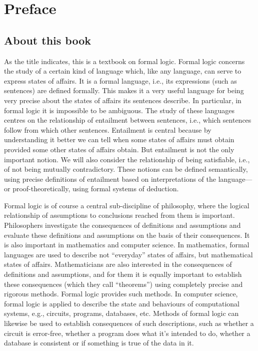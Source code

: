 \chapter{Preface}

\section{About this book}

As the title indicates, this is a textbook on formal logic.  Formal logic concerns the study of a certain kind of language which, like any language, can serve to express states of affairs.  It is a formal language, i.e., its expressions (such as sentences) are defined formally.  This makes it a very useful language for being very precise about the states of affairs its sentences describe. In particular, in formal logic it is impossible to be ambiguous. The study of these languages centres on the relationship of entailment between sentences, i.e., which sentences follow from which other sentences.  Entailment is central because by understanding it better we can tell when some states of affairs must obtain provided some other states of affairs obtain.  But entailment is not the only important notion. We will also consider the relationship of being satisfiable, i.e., of not being mutually contradictory.  These notions can be defined semantically, using precise definitions of entailment based on interpretations of the language---or proof-theoretically, using formal systems of deduction.

Formal logic is of course a central sub-discipline of philosophy, where the logical relationship of assumptions to conclusions reached from them is important.  Philosophers investigate the consequences of definitions and assumptions and evaluate these definitions and assumptions on the basis of their consequences. It is also important in mathematics and computer science. In mathematics, formal languages are used to describe not ``everyday'' states of affairs, but mathematical states of affairs. Mathematicians are also interested in the consequences of definitions and assumptions, and for them it is equally important to establish these consequences (which they call ``theorems'') using completely precise and rigorous methods. Formal logic provides such methods.  In computer science, formal logic is applied to describe the state and behaviours of computational systems, e.g., circuits, programs, databases, etc.  Methods of formal logic can likewise be used to establish consequences of such descriptions, such as whether a circuit is error-free, whether a program does what it's intended to do, whether a database is consistent or if something is true of the data in it.

